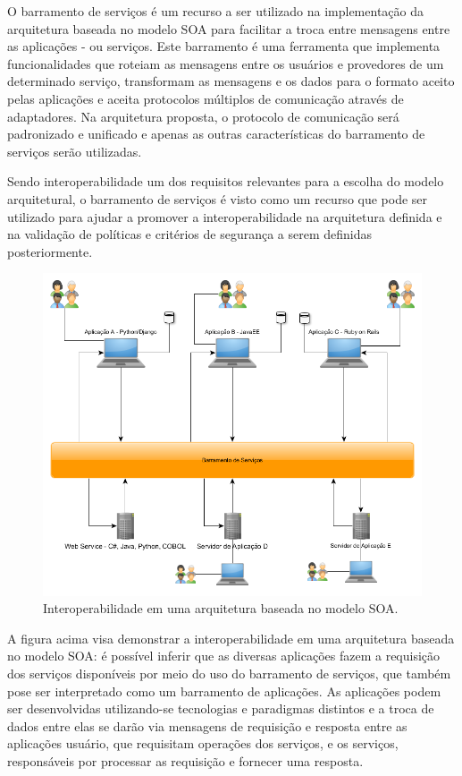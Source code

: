 O barramento de serviços é um recurso a ser utilizado na implementação da arquitetura baseada no modelo SOA para facilitar a troca entre mensagens entre as aplicações - ou serviços. Este barramento é uma ferramenta que implementa funcionalidades que roteiam as mensagens entre os usuários e provedores de um determinado serviço, transformam as mensagens e os dados para o formato aceito pelas aplicações e aceita protocolos múltiplos de comunicação através de adaptadores. Na arquitetura proposta, o protocolo de comunicação será padronizado e unificado e apenas as outras características do barramento de serviços serão utilizadas.

Sendo interoperabilidade um dos requisitos relevantes para a escolha do modelo arquitetural, o barramento de serviços é visto como um recurso que pode ser utilizado para ajudar a promover a interoperabilidade na arquitetura definida e na validação de políticas e critérios de segurança a serem definidas posteriormente.

\begin{figure}[htb]
\centering
\includegraphics[width=1\textwidth]{figuras/barramento_interoperabilidade.PNG}
\caption{Interoperabilidade em uma arquitetura baseada no modelo SOA.}
\label{barramento_interoperabilidade}
\end{figure}

A figura acima visa demonstrar a interoperabilidade em uma arquitetura baseada no modelo SOA: é possível inferir que as diversas aplicações fazem a requisição dos serviços disponíveis por meio do uso do barramento de serviços, que também pose ser interpretado como um barramento de aplicações. As aplicações podem ser desenvolvidas utilizando-se tecnologias e paradigmas distintos e a troca de dados entre elas se darão via mensagens de requisição e resposta entre as aplicações usuário, que requisitam operações dos serviços, e os serviços, responsáveis por processar as requisição e fornecer uma resposta.


